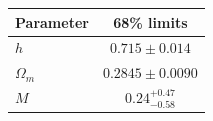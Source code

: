 \begin{tabular} { l  c}

 Parameter &  68\% limits\\
\hline
{\boldmath$h              $} & $0.715\pm 0.014            $\\

{\boldmath$Ω_m            $} & $0.2845\pm 0.0090          $\\

{\boldmath$M              $} & $0.24^{+0.47}_{-0.58}      $\\
\hline
\end{tabular}